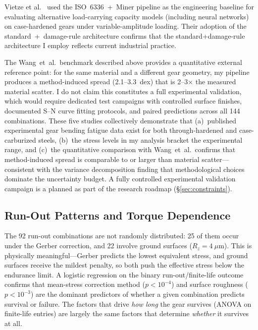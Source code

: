 \documentclass[12pt,a4paper]{article}
\begin{document}
Vietze et al.~\cite{vietze2024} used the ISO~6336~+~Miner pipeline as the
engineering baseline for evaluating alternative load-carrying capacity
models (including neural networks) on case-hardened gears under
variable-amplitude loading. Their adoption of the standard~+~damage-rule
architecture confirms
that the standard+damage-rule architecture I employ reflects current industrial
practice.

The Wang~et~al.\ benchmark described above provides a quantitative
external reference point: for the same material and a different gear
geometry, my pipeline produces a method-induced spread (2.1--3.3~dex)
that is 2--3$\times$ the measured material scatter. I do not claim
this constitutes a full experimental validation, which would require
dedicated test campaigns with controlled surface finishes, documented
S--N curve fitting protocols, and paired predictions across all 144
combinations. These five studies collectively demonstrate that
(a)~published experimental gear bending fatigue data exist for both
through-hardened and case-carburized steels, (b)~the stress levels in
my analysis bracket the experimental range, and (c)~the quantitative
comparison with Wang~et~al.\ confirms that method-induced spread is
comparable to or larger than material scatter---consistent with the
variance decomposition finding that methodological choices dominate
the uncertainty budget. A fully controlled experimental validation
campaign is a planned as part of the research roadmap (\S\ref{sec:constraints}).

\subsection{Run-Out Patterns and Torque Dependence}

The 92 run-out combinations are not randomly distributed: 25 of them
occur under the Gerber correction, and 22 involve ground surfaces
($R_z = 4~\mu$m). This is physically meaningful---Gerber predicts the
lowest equivalent stress, and ground surfaces receive the mildest
penalty, so both push the effective stress below the endurance limit.
A logistic regression on the binary run-out/finite-life outcome
confirms that mean-stress correction method ($p < 10^{-4}$) and
surface roughness ($p < 10^{-3}$) are the dominant predictors of
whether a given combination predicts survival or failure. The factors
that drive \emph{how long} the gear survives (ANOVA on finite-life
entries) are largely the same factors that determine \emph{whether} it
survives at all.
\end{document}
